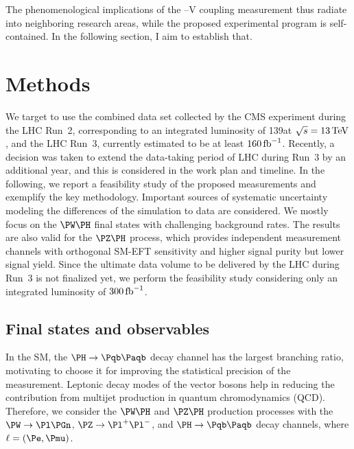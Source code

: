 \documentclass[a4paper,11pt]{article}
\newcommand{\Pb}{{{\Pqb}}\xspace}
\newcommand{\PAb}{{{{\Paqb}}}\xspace}
\renewcommand{\PV}{{{{V}}}\xspace}
\begin{document}
The phenomenological implications of the \PH--\PV coupling measurement thus radiate into neighboring research areas, while the proposed experimental program is self-contained.
In the following section, I aim to establish that. 

\section{Methods}
\label{sec:method}

We target to use the combined data set collected by the CMS experiment during the LHC Run~2, corresponding to an integrated luminosity of 139\fbinv at $\sqrt{s}=13\,\text{Te\hspace{-.08em}V}$, and the LHC Run~3, currently estimated to be at least $160\mbox{\ensuremath{\,\text{fb}^{-1}}}$.
Recently, a decision was taken to extend the data-taking period of LHC during Run~3 by an additional year, and this is considered in the work plan and timeline. 
In the following, we report a feasibility study of the proposed measurements and exemplify the key methodology.
Important sources of systematic uncertainty modeling the differences of the simulation to data are considered. 
We mostly focus on the $\PW\PH$ final states with challenging background rates. 
The results are also valid for the $\PZ\PH$ process, which provides independent measurement channels with orthogonal SM-EFT sensitivity and higher signal purity but lower signal yield.
Since the ultimate data volume to be delivered by the LHC during Run~3 is not finalized yet, we perform the feasibility study considering only an integrated luminosity of $300\mbox{\ensuremath{\,\text{fb}^{-1}}}$. 

\subsection{Final states and observables}

In the SM, the $\PH\rightarrow\Pb \PAb$ decay channel has the largest branching ratio, motivating to choose it for improving the statistical precision of the measurement.
Leptonic decay modes of the vector bosons help in reducing the contribution from multijet production in quantum chromodynamics (QCD).
Therefore, we consider the $\PW\PH$ and $\PZ\PH$ production processes with the $\PW\rightarrow\Pl\Pgn$, $\PZ\rightarrow{\Pl}^{+} {\Pl}^{-}$, and $\PH\rightarrow\Pb\PAb $ decay channels, where $\ell=(\Pe, \Pmu)$.
\end{document}
